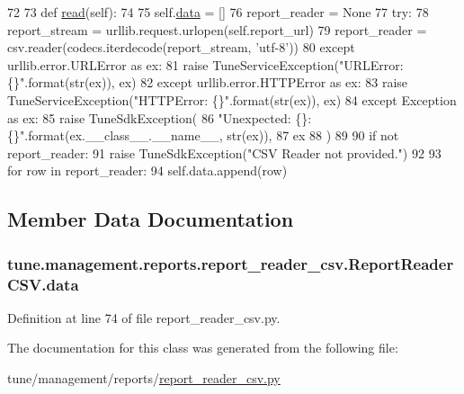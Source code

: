 \begin{DoxyCode}
72 
73     \textcolor{keyword}{def }\hyperlink{classtune_1_1management_1_1reports_1_1report__reader__csv_1_1ReportReaderCSV_a761840bd958d0c771e9638a637bcfd55}{read}(self):
74 
75         self.\hyperlink{classtune_1_1management_1_1reports_1_1report__reader__csv_1_1ReportReaderCSV_a54edf30f0b976974d271d655393f90d8}{data} = []
76         report\_reader = \textcolor{keywordtype}{None}
77         \textcolor{keywordflow}{try}:
78             report\_stream = urllib.request.urlopen(self.report\_url)
79             report\_reader = csv.reader(codecs.iterdecode(report\_stream, \textcolor{stringliteral}{'utf-8'}))
80         \textcolor{keywordflow}{except} urllib.error.URLError \textcolor{keyword}{as} ex:
81             \textcolor{keywordflow}{raise} TuneServiceException(\textcolor{stringliteral}{"URLError: \{\}"}.format(str(ex)), ex)
82         \textcolor{keywordflow}{except} urllib.error.HTTPError \textcolor{keyword}{as} ex:
83             \textcolor{keywordflow}{raise} TuneServiceException(\textcolor{stringliteral}{"HTTPError: \{\}"}.format(str(ex)), ex)
84         \textcolor{keywordflow}{except} Exception \textcolor{keyword}{as} ex:
85             \textcolor{keywordflow}{raise} TuneSdkException(
86                 \textcolor{stringliteral}{"Unexpected: \{\}: \{\}"}.format(ex.\_\_class\_\_.\_\_name\_\_, str(ex)),
87                 ex
88             )
89 
90         \textcolor{keywordflow}{if} \textcolor{keywordflow}{not} report\_reader:
91             \textcolor{keywordflow}{raise} TuneSdkException(\textcolor{stringliteral}{"CSV Reader not provided."})
92 
93         \textcolor{keywordflow}{for} row \textcolor{keywordflow}{in} report\_reader:
94             self.data.append(row)
\end{DoxyCode}


\subsection{Member Data Documentation}
\hypertarget{classtune_1_1management_1_1reports_1_1report__reader__csv_1_1ReportReaderCSV_a54edf30f0b976974d271d655393f90d8}{
\subsubsection[{data}]{\setlength{\rightskip}{0pt plus 5cm}tune.\-management.\-reports.\-report\-\_\-reader\-\_\-csv.\-Report\-Reader\-C\-S\-V.\-data}}\label{classtune_1_1management_1_1reports_1_1report__reader__csv_1_1ReportReaderCSV_a54edf30f0b976974d271d655393f90d8}


Definition at line 74 of file report\-\_\-reader\-\_\-csv.\-py.



The documentation for this class was generated from the following file\-:\begin{DoxyCompactItemize}
\item 
tune/management/reports/\hyperlink{report__reader__csv_8py}{report\-\_\-reader\-\_\-csv.\-py}\end{DoxyCompactItemize}
